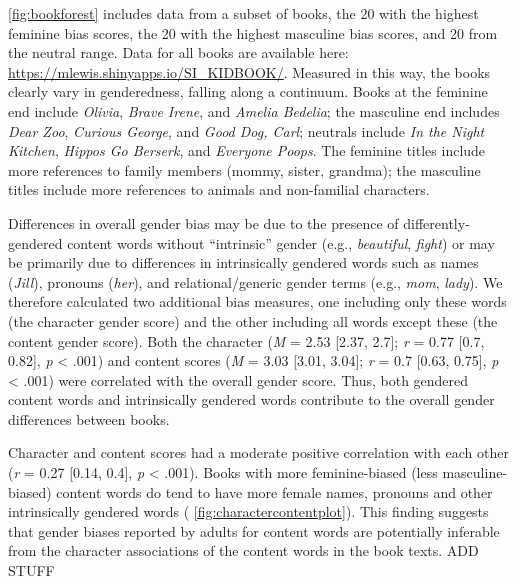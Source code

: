 \documentclass[english,,man,floatsintext]{apa6}
\begin{document}
\autoref{fig:bookforest} includes data from a subset of books, the 20 with the highest feminine bias scores, the 20 with the highest masculine bias scores, and 20 from the neutral range. Data for all books are available here: \url{https://mlewis.shinyapps.io/SI_KIDBOOK/}. Measured in this way, the books clearly vary in genderedness, falling along a continuum. Books at the feminine end include \emph{Olivia}, \emph{Brave Irene}, and \emph{Amelia Bedelia}; the masculine end includes \emph{Dear Zoo}, \emph{Curious George}, and \emph{Good Dog, Carl}; neutrals include \emph{In the Night Kitchen}, \emph{Hippos Go Berserk}, and \emph{Everyone Poops}. The feminine titles include more references to family members (mommy, sister, grandma); the masculine titles include more references to animals and non-familial characters.

Differences in overall gender bias may be due to the presence of differently-gendered content words without \enquote{intrinsic} gender (e.g., \emph{beautiful}, \emph{fight}) or may be primarily due to differences in intrinsically gendered words such as names (\emph{Jill}), pronouns (\emph{her}), and relational/generic gender terms (e.g., \emph{mom}, \emph{lady}). We therefore calculated two additional bias measures, one including only these words (the character gender score) and the other including all words except these (the content gender score). Both the character (\emph{M} = 2.53 {[}2.37, 2.7{]}; \emph{r} = 0.77 {[}0.7, 0.82{]}, \emph{p} \textless{} .001) and content scores (\emph{M} = 3.03 {[}3.01, 3.04{]}; \emph{r} = 0.7 {[}0.63, 0.75{]}, \emph{p} \textless{} .001) were correlated with the overall gender score. Thus, both gendered content words and intrinsically gendered words contribute to the overall gender differences between books.

Character and content scores had a moderate positive correlation with each other (\emph{r} = 0.27 {[}0.14, 0.4{]}, \emph{p} \textless{} .001). Books with more feminine-biased (less masculine-biased) content words do tend to have more female names, pronouns and other intrinsically gendered words ( \autoref{fig:charactercontentplot}). This finding suggests that gender biases reported by adults for content words are potentially inferable from the character associations of the content words in the book texts. ADD STUFF
\end{document}
